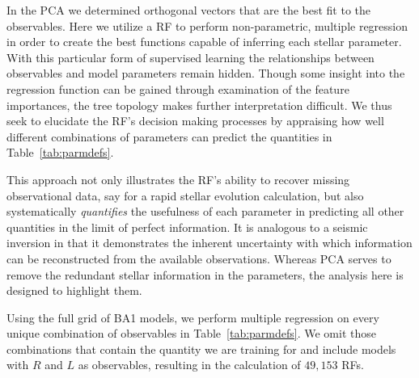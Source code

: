 In the PCA we determined orthogonal vectors that are the best fit to the observables. 
Here we utilize a RF to perform non-parametric, multiple regression in order to create the best functions capable of inferring each stellar parameter. With this particular form of supervised learning 
the relationships between observables and model parameters remain hidden. Though some insight into the regression function can be gained through examination of the feature importances, the tree topology makes further interpretation difficult. 
We thus seek to elucidate the RF's decision making processes by appraising
how well different combinations of parameters can predict the quantities in Table~\ref{tab:parmdefs}. 
 
 This approach not only illustrates the RF's ability to recover missing observational data, say for a rapid stellar evolution calculation, but also systematically \emph{quantifies} the usefulness of each parameter in predicting all other quantities in the limit of perfect information. It is analogous to a seismic inversion in that it demonstrates the inherent uncertainty with which information can be reconstructed from the available observations. 
Whereas PCA serves to remove the redundant stellar information in the parameters, the analysis here is designed to highlight them. 

Using the full grid of BA1 models, we perform multiple regression on every unique combination of observables in Table~\ref{tab:parmdefs}. We omit those combinations that contain the quantity we are training for and include models with $R$ and $L$ as observables, resulting in the calculation of $49,153$ RFs. 


